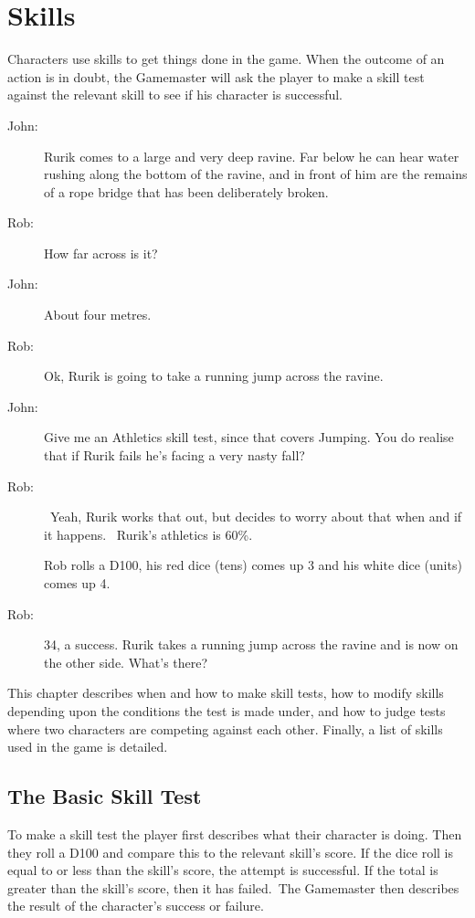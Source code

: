\chapter{Skills}
\label{ch:skills}

Characters use skills to get things done in the game. When the outcome of an action is in doubt, the Gamemaster will ask the player to make a skill test against the relevant skill to see if his character is successful.

\begin{rpg-examplebox}
\begin{description}
	\item[John:] Rurik comes to a large and very deep ravine. Far below he can hear water rushing along the bottom of the ravine, and in front of him are the remains of a rope bridge that has been deliberately broken.
	\item[Rob:] How far across is it?
	\item[John:] About four metres.
	\item[Rob:] Ok, Rurik is going to take a running jump across the ravine.
	\item[John:] Give me an Athletics skill test, since that covers Jumping. You do realise that if Rurik fails he’s facing a very nasty fall?
	\item[Rob:] Yeah, Rurik works that out, but decides to worry about that when and if it happens.  Rurik’s athletics is 60\%.
	\item[] Rob rolls a D100, his red dice (tens) comes up 3 and his white dice (units) comes up 4.
	\item[Rob:] 34, a success. Rurik takes a running jump across the ravine and is now on the other side. What’s there?
\end{description}
\end{rpg-examplebox}

This chapter describes when and how to make skill tests, how to modify skills depending upon the conditions the test is made under, and how to judge tests where two characters are competing against each other. Finally, a list of skills used in the game is detailed.

\section{The Basic Skill Test}
To make a skill test the player first describes what their character is doing. Then they roll a D100 and compare this to the relevant skill’s score. If the dice roll is equal to or less than the skill’s score, the attempt is successful. If the total is greater than the skill’s score, then it has failed. The Gamemaster then describes the result of the character’s success or failure.

